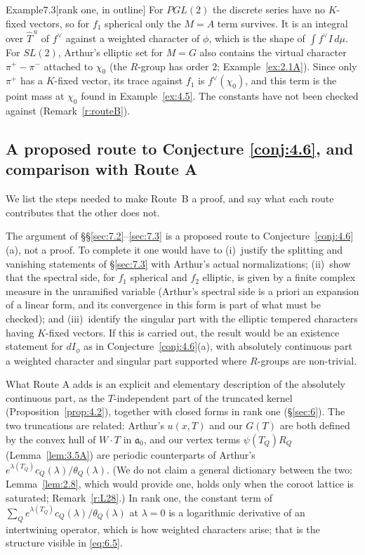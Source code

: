 \documentclass[12pt,letterpaper]{article}
\numberwithin{equation}{section}
\theoremstyle{plain}
\theoremstyle{remark}
\theoremstyle{plain}
\theoremstyle{definition}
\theoremstyle{remark}
\newcounter{rtw}
\theoremstyle{remark}
\newcommand{\fa}{\mathfrak{a}}
\newcommand{\Thu}{\widehat{T}^{\,u}}
\begin{document}
\begin{fixedrem}{Example}{7.3}[rank one, in outline]\label{ex:7.3}
For $PGL(2)$ the discrete series have no $K$-fixed vectors, so for $f_1$ spherical only the $M=A$ term survives. It is an integral over $\Thu$ of $f^\vee$ against a weighted character of $\phi$, which is the shape of $\int f^\vee I\,d\mu$. For $SL(2)$, Arthur's elliptic set for $M=G$ also contains the virtual character $\pi^+-\pi^-$ attached to $\chi_0$ (the $R$-group has order $2$; Example~\ref{ex:2.1A}). Since only $\pi^+$ has a $K$-fixed vector, its trace against $f_1$ is $f^\vee(\chi_0)$, and this term is the point mass at $\chi_0$ found in Example~\ref{ex:4.5}. The constants have not been checked against \cite{Ar93} (Remark~\ref{r:routeB}).
\end{fixedrem}

\subsection{A proposed route to Conjecture \ref{conj:4.6}, and comparison with Route A}\label{sec:7.4}

We list the steps needed to make Route~B a proof, and say what each route contributes that the other does not.

The argument of \S\S\ref{sec:7.2}--\ref{sec:7.3} is a proposed route to Conjecture~\ref{conj:4.6}(a), not a proof. To complete it one would have to (i)~justify the splitting and vanishing statements of \S\ref{sec:7.3} with Arthur's actual normalizations; (ii)~show that the spectral side, for $f_1$ spherical and $f_2$ elliptic, is given by a finite complex measure in the unramified variable (Arthur's spectral side is a priori an expansion of a linear form, and its convergence in this form is part of what must be checked); and (iii)~identify the singular part with the elliptic tempered characters having $K$-fixed vectors. If this is carried out, the result would be an existence statement for $dI_\phi$ as in Conjecture~\ref{conj:4.6}(a), with absolutely continuous part a weighted character and singular part supported where $R$-groups are non-trivial.

What Route A adds is an explicit and elementary description of the absolutely continuous part, as the $T$-independent part of the truncated kernel (Proposition~\ref{prop:4.2}), together with closed forms in rank one (\S\ref{sec:6}). The two truncations are related: Arthur's $u(x,T)$ and our $G(T)$ are both defined by the convex hull of $W\cdot T$ in $\fa_0$, and our vertex terms $\psi(T_Q)R_Q$ (Lemma~\ref{lem:3.5A}) are periodic counterparts of Arthur's $e^{\lambda(T_Q)}c_Q(\lambda)/\theta_Q(\lambda)$. (We do not claim a general dictionary between the two: Lemma~\ref{lem:2.8}, which would provide one, holds only when the coroot lattice is saturated; Remark~\ref{r:L28}.) In rank one, the constant term of $\sum_Qe^{\lambda(T_Q)}c_Q(\lambda)/\theta_Q(\lambda)$ at $\lambda=0$ is a logarithmic derivative of an intertwining operator, which is how weighted characters arise; that is the structure visible in \eqref{eq:6.5}.
\end{document}
